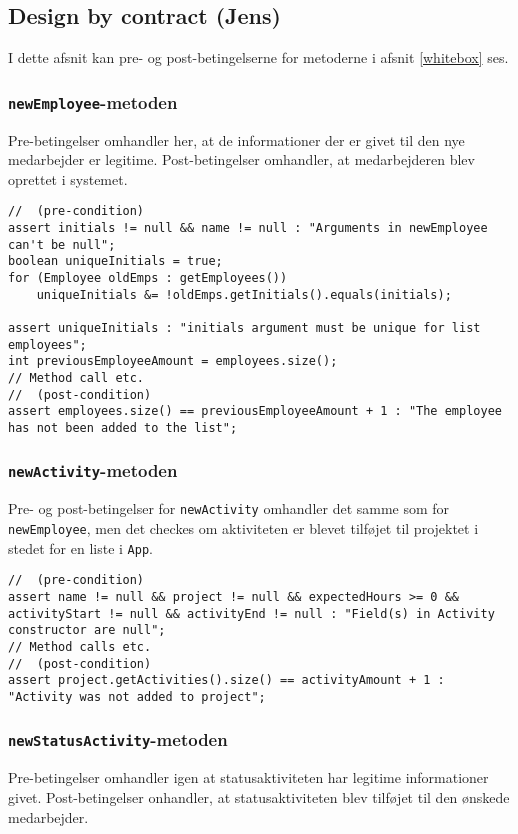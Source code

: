 \subsection{Design by contract (Jens)}
I dette afsnit kan pre- og post-betingelserne for metoderne i afsnit \ref{whitebox} ses.

\subsubsection{\texttt{newEmployee}-metoden}
Pre-betingelser omhandler her, at de informationer der er givet til den nye medarbejder er legitime. Post-betingelser omhandler, at medarbejderen blev oprettet i systemet.

\begin{lstlisting}
//  (pre-condition)
assert initials != null && name != null : "Arguments in newEmployee can't be null";
boolean uniqueInitials = true;
for (Employee oldEmps : getEmployees())
    uniqueInitials &= !oldEmps.getInitials().equals(initials);

assert uniqueInitials : "initials argument must be unique for list employees";
int previousEmployeeAmount = employees.size();
// Method call etc. 
//  (post-condition)
assert employees.size() == previousEmployeeAmount + 1 : "The employee has not been added to the list";
\end{lstlisting}

\subsubsection{\texttt{newActivity}-metoden}
Pre- og post-betingelser for \texttt{newActivity} omhandler det samme som for \texttt{newEmployee}, men det checkes om aktiviteten er blevet tilføjet til projektet i stedet for en liste i \texttt{App}.

\begin{lstlisting}
//  (pre-condition)
assert name != null && project != null && expectedHours >= 0 && activityStart != null && activityEnd != null : "Field(s) in Activity constructor are null";
// Method calls etc.
//  (post-condition)
assert project.getActivities().size() == activityAmount + 1 : "Activity was not added to project"; 
\end{lstlisting}

\subsubsection{\texttt{newStatusActivity}-metoden}
Pre-betingelser omhandler igen at statusaktiviteten har legitime informationer givet. Post-betingelser onhandler, at statusaktiviteten blev tilføjet til den ønskede medarbejder.

